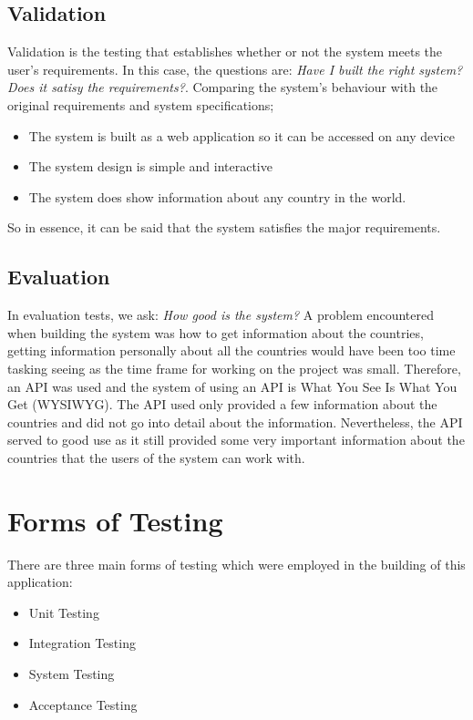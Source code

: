 \documentclass[twoside, a4paper, 12pt]{report}
\begin{document}
\subsection{Validation}
Validation is the testing that establishes whether or not the system meets the user’s requirements. In this case, the questions are: \emph{Have I built the right system? Does it satisy the requirements?}. Comparing the system's behaviour with the original requirements and system specifications;
\begin{itemize}
	\item The system is built as a web application so it can be accessed on any device
	\item The system design is simple and interactive
	\item The system does show information about any country in the world.
\end{itemize}
So in essence, it can be said that the system satisfies the major requirements.

\subsection{Evaluation}
In evaluation tests, we ask: \emph{How good is the system?} A problem encountered when building the system was how to get information about the countries, getting information personally about all the countries would have been too time tasking seeing as the time frame for working on the project was small. Therefore, an API was used and the system of using an API is What You See Is What You Get (WYSIWYG). The API used only provided a few information about the countries and did not go into detail about the information. Nevertheless, the API served to good use as it still provided some very important information about the countries that the users of the system can work with.

\section{Forms of Testing}
There are three main forms of testing which were employed in the building of this application:

\begin{itemize}
	\item Unit Testing
	\item Integration Testing
	\item System Testing
	\item Acceptance Testing
\end{itemize}
\end{document}
